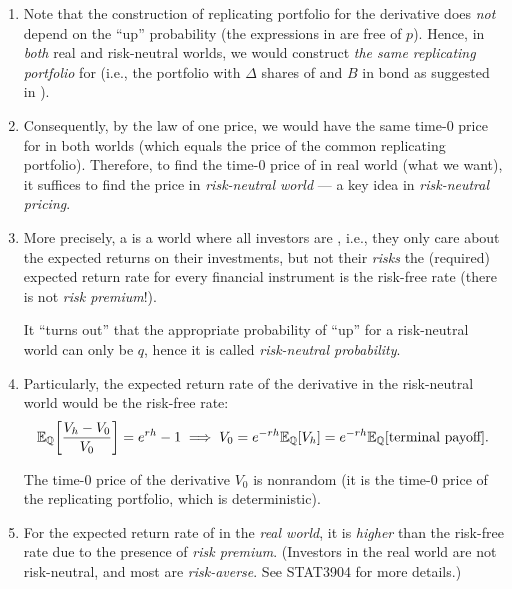 \begin{enumerate}
\item Note that the construction of replicating portfolio for the derivative
 does \emph{not} depend on the ``up'' probability (the
expressions in  are free of \(p\)). Hence, in
\emph{both} real and risk-neutral worlds, we would construct \emph{the same
replicating portfolio} for  (i.e., the portfolio with \(\Delta\)
shares of  and \(B\) in bond as suggested in
).

\item Consequently, by the law of one price, we would have the same time-0 price
for  in both worlds (which equals the price of the common
replicating portfolio). Therefore, to find the time-0 price of 
in real world (what we want), it suffices to find the price in
\emph{risk-neutral world} --- a key idea in \emph{risk-neutral pricing}.

\item More precisely, a  is a world where all
investors are , i.e., they only care about the expected
returns on their investments, but not their \emph{risks} 
the (required) expected return rate for every financial instrument is the
risk-free rate (there is not \emph{risk premium}!).

\begin{note}
It ``turns out'' that the appropriate probability of ``up'' for a risk-neutral
world can only be \(q\), hence it is called \emph{risk-neutral probability}.
\end{note}


\item \label{it:rn-pricing-fmla-deriv}
Particularly, the expected return rate of the derivative 
in the risk-neutral world would be the risk-free rate:
\[
\mathbb{E}_{\mathbb{Q}}\qty[\frac{V_h-V_0}{V_0}]=e^{rh}-1\implies
V_0=e^{-rh}\mathbb{E}_{\mathbb{Q}}\qty[V_h]
=e^{-rh}\mathbb{E}_{\mathbb{Q}}\qty[\text{terminal payoff}].
\]
\begin{note}
The time-0 price of the derivative \(V_0\) is nonrandom (it is the time-0
price of the replicating portfolio, which is deterministic).
\end{note}

\item For the expected return rate of  in the \emph{real world},
it is \emph{higher} than the risk-free rate due to the presence of \emph{risk
premium}. (Investors in the real world are not risk-neutral, and most are
\emph{risk-averse}. See STAT3904 for more details.)


\end{enumerate}

